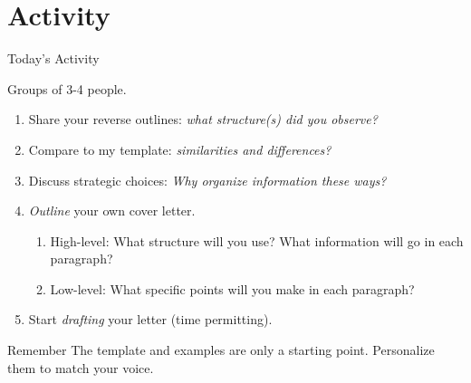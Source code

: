 \documentclass{beamer}
\begin{document}
\section{Activity}

\begin{frame}{Today's Activity}

  Groups of 3-4 people.

  \medskip

  \begin{enumerate}
    \item Share your reverse outlines: \textit{what structure(s) did you observe?}
    \item Compare to my template: \textit{similarities and differences?}
    \item Discuss strategic choices: \textit{Why organize information these ways?}
    \item \textit{Outline} your own cover letter. 
    \begin{enumerate}
      \item High-level: What structure will you use? What information will go in each paragraph?
      \item Low-level: What specific points will you make in each paragraph?
    \end{enumerate} 
    \item Start \textit{drafting} your letter (time permitting).
  \end{enumerate}

  \medskip
  \begin{block}{Remember}
    The template and examples are only a starting point. Personalize them to match your voice.
  \end{block}

\end{frame}
\end{document}
